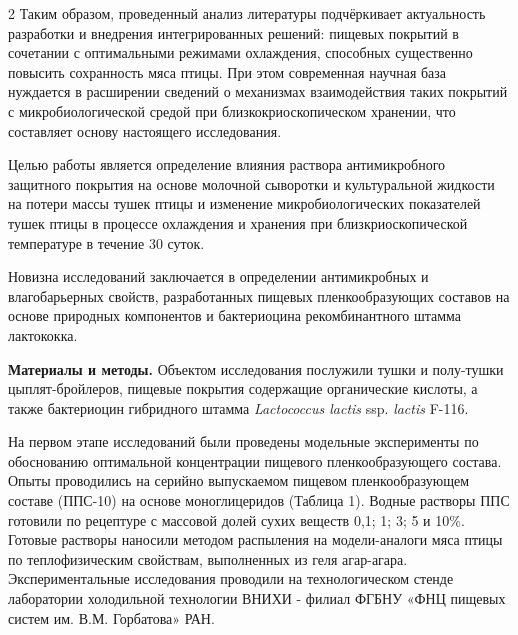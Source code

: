 \begin{multicols}{2}
Таким образом, проведенный анализ литературы подчёркивает актуальность
разработки и внедрения интегрированных решений: пищевых покрытий в
сочетании с оптимальными режимами охлаждения, способных существенно
повысить сохранность мяса птицы. При этом современная научная база
нуждается в расширении сведений о механизмах взаимодействия таких
покрытий с микробиологической средой при близкокриоскопическом хранении,
что составляет основу настоящего исследования.

Целью работы является определение влияния раствора антимикробного
защитного покрытия на основе молочной сыворотки и культуральной жидкости
на потери массы тушек птицы и изменение микробиологических показателей
тушек птицы в процессе охлаждения и хранения при близкриоскопической
температуре в течение 30 суток.

Новизна исследований заключается в определении антимикробных и
влагобарьерных свойств, разработанных пищевых пленкообразующих составов
на основе природных компонентов и бактериоцина рекомбинантного штамма
лактококка.

{\bfseries Материалы и методы.} Объектом исследования послужили тушки и
полу-тушки цыплят-бройлеров, пищевые покрытия содержащие органические
кислоты, а также бактериоцин гибридного штамма \emph{Lactococcus lactis}
ssp. \emph{lactis} F-116.

На первом этапе исследований были проведены модельные эксперименты по
обоснованию оптимальной концентрации пищевого пленкообразующего состава.
Опыты проводились на серийно выпускае­мом пищевом пленкообразующем
составе (ППС-10) на основе моноглицеридов (Таблица 1). Водные растворы
ППС готовили по рецептуре с массовой долей сухих веществ 0,1; 1; 3; 5 и
10\%. Готовые растворы наносили методом распыления на модели-аналоги
мяса птицы по теплофизиче­ским свойствам, выполненных из геля агар-агара.
Экспериментальные исследования проводили на технологическом стенде
лаборатории холодильной технологии ВНИХИ - филиал ФГБНУ «ФНЦ пищевых
систем им. В.М. Горбатова» РАН.
\end{multicols}

